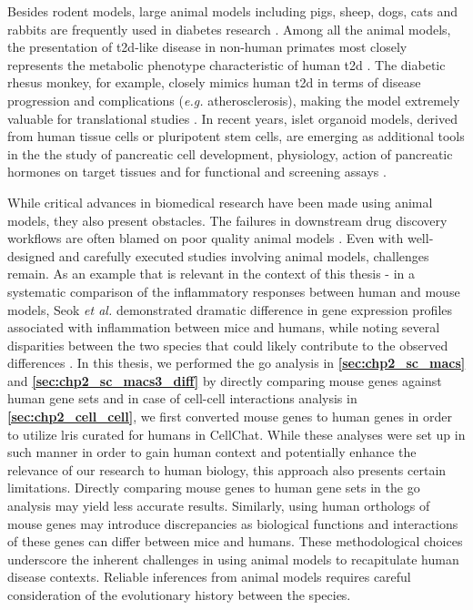\par Besides rodent models, large animal models including pigs, sheep, dogs, cats and rabbits are frequently used in diabetes research \textbf{\cite{cefalu_animal_2006,lutz_mammalian_2023,singh_animal_2024,covington_animal_2024}}. Among all the animal models, the presentation of \gls{t2d}-like disease in non-human primates most closely represents the metabolic phenotype characteristic of human \gls{t2d} \textbf{\cite{lutz_mammalian_2023,cefalu_animal_2006}}. The diabetic rhesus monkey, for example, closely mimics human \gls{t2d} in terms of disease progression and complications (\textit{e.g.} atherosclerosis), making the model extremely valuable for translational studies \textbf{\cite{singh_animal_2024}}. In recent years, islet organoid models, derived from human tissue cells or pluripotent stem cells, are emerging as additional tools in the the study of pancreatic cell development, physiology, action of pancreatic hormones on target tissues and for functional and screening assays \textbf{\cite{beydag-tasoz_towards_2023,zhang_islet_2022}}.\\

\par While critical advances in biomedical research have been made using animal models, they also present obstacles. The failures in downstream drug discovery workflows are often blamed on poor quality animal models \textbf{\cite{mcmurray_mouse_2011}}. Even with well-designed and carefully executed studies involving animal models, challenges remain. As an example that is relevant in the context of this thesis - in a systematic comparison of the inflammatory responses between human and mouse models, Seok \textit{et al.} demonstrated dramatic difference in gene expression profiles associated with inflammation between mice and humans, while noting several disparities between the two species that could likely contribute to the observed differences \textbf{\cite{bolker_animal_2017, seok_genomic_2013}}. In this thesis, we performed the \gls{go} analysis in \textbf{\autoref{sec:chp2_sc_macs}} and \textbf{\autoref{sec:chp2_sc_macs3_diff}} by directly comparing mouse genes against human gene sets and in case of cell-cell interactions analysis in \textbf{\autoref{sec:chp2_cell_cell}}, we first converted mouse genes to human genes in order to utilize \glspl{lri} curated for humans in CellChat. While these analyses were set up in such manner in order to gain human context and potentially enhance the relevance of our research to human biology, this approach also presents certain limitations. Directly comparing mouse genes to human gene sets in the \gls{go} analysis may yield less accurate results. Similarly, using human orthologs of mouse genes may introduce discrepancies as biological functions and interactions of these genes can differ between mice and humans. These methodological choices underscore the inherent challenges in using animal models to recapitulate human disease contexts. Reliable inferences from animal models requires careful consideration of the evolutionary history between the species.\\

